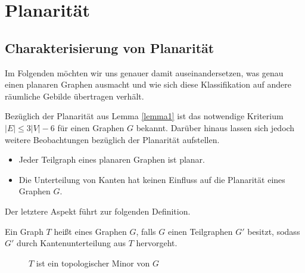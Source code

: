 
\section{Planarität}
\subsection{Charakterisierung von Planarität}
Im Folgenden möchten wir uns genauer damit auseinandersetzen, was genau einen planaren Graphen ausmacht und wie sich diese Klassifikation auf andere räumliche Gebilde übertragen verhält. 

Bezüglich der Planarität aus Lemma \ref{lemma1} ist das notwendige Kriterium $|E| \leq 3|V|-6$ für einen Graphen $G$ bekannt. Darüber hinaus lassen sich jedoch weitere Beobachtungen bezüglich der Planarität  aufstellen.
\begin{itemize}
\item Jeder Teilgraph eines planaren Graphen ist planar.
\item Die Unterteilung von Kanten hat keinen Einfluss auf die Planarität eines Graphen $G$.
\end{itemize}
Der letztere Aspekt führt zur folgenden Definition.
\begin{df} Ein Graph $T$ heißt  eines Graphen $G$, falls $G$ einen Teilgraphen $G'$ besitzt, sodass $G'$ durch Kantenunterteilung aus $T$ hervorgeht. \end{df}
\begin{figure}
\caption{$T$ ist ein topologischer Minor von $G$}
\label{topM}
\end{figure}

